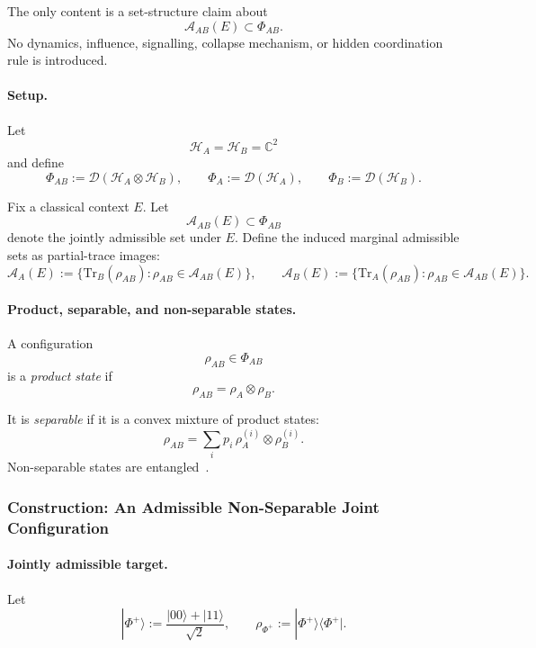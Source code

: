 \documentclass[aps,prx,onecolumn,11pt]{revtex4-2}
\theoremstyle{plain}
\theoremstyle{definition}
\theoremstyle{remark}
\begin{document}
The only content is a set-structure claim about
\[
\mathcal A_{AB}(E)\subset\Phi_{AB}.
\]
No dynamics, influence, signalling, collapse mechanism, or hidden
coordination rule is introduced.

\paragraph{Setup.}

Let
\[
\mathcal H_A=\mathcal H_B=\mathbb C^2
\]
and define
\[
\Phi_{AB}
:=
\mathcal D(\mathcal H_A\otimes\mathcal H_B),
\qquad
\Phi_A
:=
\mathcal D(\mathcal H_A),
\qquad
\Phi_B
:=
\mathcal D(\mathcal H_B).
\]

Fix a classical context \(E\). Let
\[
\mathcal A_{AB}(E)\subset\Phi_{AB}
\]
denote the jointly admissible set under \(E\). Define the induced
marginal admissible sets as partial-trace images:
\begin{equation}
\mathcal A_A(E)
:=
\{\mathrm{Tr}_B(\rho_{AB}):\rho_{AB}\in\mathcal A_{AB}(E)\},
\qquad
\mathcal A_B(E)
:=
\{\mathrm{Tr}_A(\rho_{AB}):\rho_{AB}\in\mathcal A_{AB}(E)\}.
\label{eq:two_qubit_induced_marginal_admissibility}
\end{equation}

\paragraph{Product, separable, and non-separable states.}

A configuration
\[
\rho_{AB}\in\Phi_{AB}
\]
is a \emph{product state} if
\[
\rho_{AB}=\rho_A\otimes\rho_B.
\]

It is \emph{separable} if it is a convex mixture of product states:
\[
\rho_{AB}
=
\sum_i p_i\,\rho_A^{(i)}\otimes\rho_B^{(i)}.
\]
Non-separable states are entangled~\cite{Horodecki2009,Watrous2018}.

\subsubsection{Construction: An Admissible Non-Separable Joint Configuration}
\label{toy:two_qubit_admissible_nonseparable_construction}

\paragraph{Jointly admissible target.}

Let
\[
|\Phi^+\rangle
:=
\frac{|00\rangle+|11\rangle}{\sqrt 2},
\qquad
\rho_{\Phi^+}
:=
|\Phi^+\rangle\langle\Phi^+|.
\]
\end{document}
